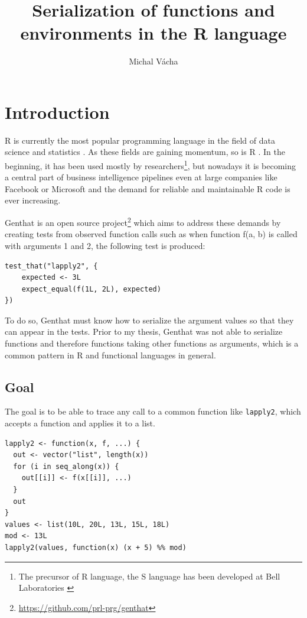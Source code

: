 \documentclass[thesis=B,english]{FITthesis}[2012/10/20]
\title{Serialization of functions and environments in the R language}
\author{Michal Vácha} %
\begin{document}

\chapter{Introduction}

R is currently the most popular programming language in the field of data science and statistics \cite{ieeeTop}. As these fields are gaining momentum, so is R \cite{soTrends}. In the beginning, it has been used mostly by researchers\footnote{The precursor of R language, the S language has been developed at Bell Laboratories \cite{langS}}, but nowadays it is becoming a central part of business intelligence pipelines even at large companies like Facebook or Microsoft\cite{usingR} and the demand for reliable and maintainable R code is ever increasing. 

Genthat is an open source project\footnote{\url{https://github.com/prl-prg/genthat}} which aims to address these demands by creating tests from observed function calls such as when function f(a, b) is called with arguments 1 and 2, the following test is produced:

\begin{verbatim}
test_that("lapply2", {
    expected <- 3L
    expect_equal(f(1L, 2L), expected)
})
\end{verbatim}

To do so, Genthat must know how to serialize the argument values so that they can appear in the tests. Prior to my thesis, Genthat was not able to serialize functions and therefore functions taking other functions as arguments, which is a common pattern in R and functional languages in general.

\section{Goal}
The goal is to be able to trace any call to a common function like \verb|lapply2|\cite{advR}, which accepts a function and applies it to a list.

\begin{verbatim}
lapply2 <- function(x, f, ...) {
  out <- vector("list", length(x))
  for (i in seq_along(x)) {
    out[[i]] <- f(x[[i]], ...)
  }
  out
}
values <- list(10L, 20L, 13L, 15L, 18L)
mod <- 13L
lapply2(values, function(x) (x + 5) %% mod)
\end{verbatim}
\end{document}

